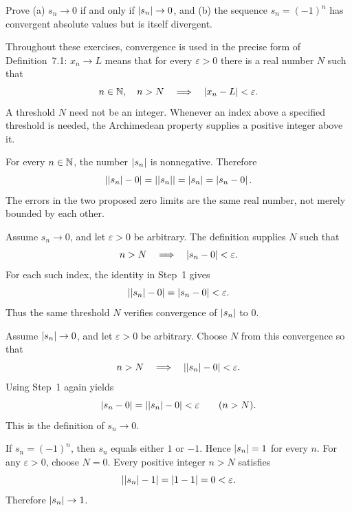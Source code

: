
\goal Prove (a) $s_n\to0$ if and only if $\left|s_n\right|\to0$, and
(b) the sequence $s_n=(-1)^n$ has convergent absolute values but is
itself divergent.

Throughout these exercises, convergence is used in the precise form of
Definition~7.1: $x_n\to L$ means that for every $\varepsilon>0$
there is a real number $N$ such that
\[
 n\in\mathbb{N},\quad n>N\quad\Longrightarrow\quad
 \left|x_n-L\right|<\varepsilon.
\]
A threshold $N$ need not be an integer. Whenever an index above a
specified threshold is needed, the Archimedean property supplies a
positive integer above it.

For every $n\in\mathbb{N}$, the number $\left|s_n\right|$ is nonnegative. Therefore
\[
 \left|\left|s_n\right|-0\right|=\left|\left|s_n\right|\right|=\left|s_n\right|
                =\left|s_n-0\right|.
\]
The errors in the two proposed zero limits are the same real number,
not merely bounded by each other.

Assume $s_n\to0$, and let $\varepsilon>0$ be arbitrary.
The definition supplies $N$ such that
\[
 n>N\quad\Longrightarrow\quad\left|s_n-0\right|<\varepsilon.
\]
For each such index, the identity in Step~1 gives
\[
 \left|\left|s_n\right|-0\right|=\left|s_n-0\right|<\varepsilon.
\]
Thus the same threshold $N$ verifies convergence of $\left|s_n\right|$ to $0$.

Assume $\left|s_n\right|\to0$, and let $\varepsilon>0$ be arbitrary.
Choose $N$ from this convergence so that
\[
 n>N\quad\Longrightarrow\quad\left|\left|s_n\right|-0\right|<\varepsilon.
\]
Using Step~1 again yields
\[
 \left|s_n-0\right|=\left|\left|s_n\right|-0\right|<\varepsilon
 \qquad(n>N).
\]
This is the definition of $s_n\to0$.


If $s_n=(-1)^n$, then $s_n$ equals either $1$ or $-1$. Hence
$\left|s_n\right|=1$ for every $n$.
For any $\varepsilon>0$, choose $N=0$. Every positive integer $n>N$
satisfies
\[
 \left|\left|s_n\right|-1\right|=\left|1-1\right|=0<\varepsilon.
\]
Therefore $\left|s_n\right|\to1$.

